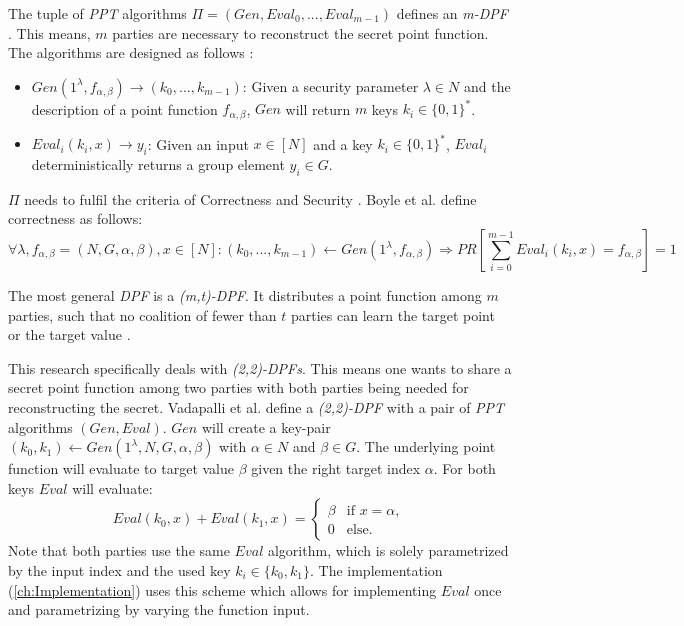 The tuple of \textit{PPT} algorithms $\Pi = (Gen, Eval_0, ..., Eval_{m-1})$ defines an \textit{m-DPF} \cite{boyle2023information}.
This means, $m$ parties are necessary to reconstruct the secret point function.
The algorithms are designed as follows \cite{boyle2023information,gilboa2014distributed,vadapalli2023duoram}:
\begin{itemize}
   \item $Gen(1^\lambda, f_{\alpha, \beta})\rightarrow(k_0,...,k_{m-1})$: Given a security parameter $\lambda\in N$ and the description of a point function $f_{\alpha, \beta}$, $Gen$ will return $m$ keys $k_i\in\{0,1\}^*$.
   \item $Eval_i(k_i,x)\rightarrow y_i$: Given an input $x\in [N]$ and a key $k_i\in\{0,1\}^*$, $Eval_i$ deterministically returns a group element $y_i\in G$.
\end{itemize}

$\Pi$ needs to fulfil the criteria of Correctness and Security \cite{boyle2023information}.
Boyle et al. \cite{boyle2023information} define correctness as follows: 
\[
\forall\lambda,f_{\alpha,\beta}=(N,G,\alpha,\beta),x\in [N]:
(k_0,...,k_{m-1})\leftarrow Gen(1^\lambda, f_{\alpha,\beta})\Rightarrow PR[\sum_{i=0}^{m-1}Eval_i(k_i,x)=f_{\alpha,\beta}] = 1
\]

The most general \textit{DPF} is a \textit{(m,t)-DPF}.
It distributes a point function among $m$ parties, such that no coalition of fewer than $t$ parties can learn the target point or the target value \cite{vadapalli2023duoram}.

This research specifically deals with \textit{(2,2)-DPFs}.
This means one wants to share a secret point function among two parties with both parties being needed for reconstructing the secret.
Vadapalli et al. \cite{vadapalli2022sabre} define a \textit{(2,2)-DPF} with a pair of \textit{PPT} algorithms $(Gen, Eval)$.
$Gen$ will create a key-pair $(k_0,k_1)\leftarrow Gen(1^\lambda,N,G,\alpha,\beta)$ with $\alpha\in N$ and $\beta\in G$.
The underlying point function will evaluate to target value $\beta$ given the right target index $\alpha$.
For both keys $Eval$ will evaluate:\[
Eval(k_0, x) + Eval(k_1,x) = \begin{cases} 
      \beta & \text{if } x = \alpha, \\
      0 & \text{else}.
   \end{cases}
\]
Note that both parties use the same $Eval$ algorithm, which is solely parametrized by the input index and the used key $k_i\in\{k_0,k_1\}$.
The implementation (\ref{ch:Implementation}) uses this scheme which allows for implementing $Eval$ once and parametrizing by varying the function input.

